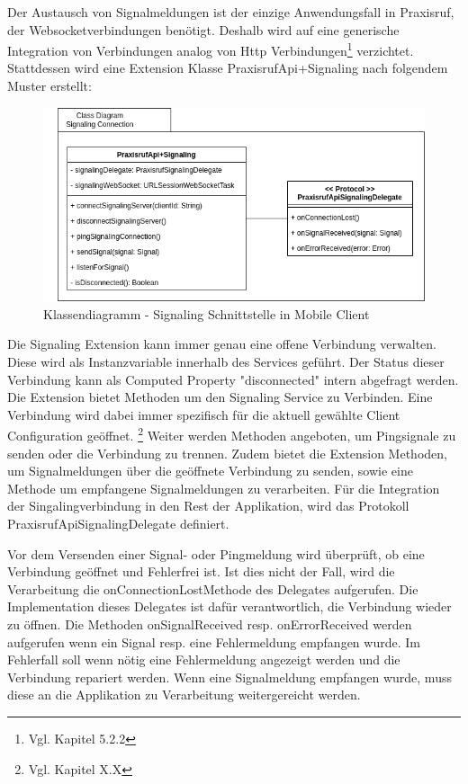 Der Austausch von Signalmeldungen ist der einzige Anwendungsfall in Praxisruf, der Websocketverbindungen benötigt.
Deshalb wird auf eine generische Integration von Verbindungen analog von Http Verbindungen\footnote{Vgl. Kapitel 5.2.2} verzichtet.
Stattdessen wird eine Extension Klasse PraxisrufApi+Signaling nach folgendem Muster erstellt:

\begin{figure}[h]
    \centering
    \begin{minipage}[b]{0.9\textwidth}
        \includegraphics[width=\textwidth]{graphics/diagramms/Class_Mobile_Client_Signaling_Connection}
        \caption{Klassendiagramm - Signaling Schnittstelle in Mobile Client}
    \end{minipage}
\end{figure}

Die Signaling Extension kann immer genau eine offene Verbindung verwalten.
Diese wird als Instanzvariable innerhalb des Services geführt.
Der Status dieser Verbindung kann als Computed Property "disconnected" intern abgefragt werden.
Die Extension bietet Methoden um den Signaling Service zu Verbinden.
Eine Verbindung wird dabei immer spezifisch für die aktuell gewählte Client Configuration geöffnet. \footnote{Vgl. Kapitel X.X}
Weiter werden Methoden angeboten, um Pingsignale zu senden oder die Verbindung zu trennen.
Zudem bietet die Extension Methoden, um Signalmeldungen über die geöffnete Verbindung zu senden,
sowie eine Methode um empfangene Signalmeldungen zu verarbeiten.
Für die Integration der Singalingverbindung in den Rest der Applikation, wird das Protokoll PraxisrufApiSignalingDelegate definiert.

Vor dem Versenden einer Signal- oder Pingmeldung wird überprüft, ob eine Verbindung geöffnet und Fehlerfrei ist.
Ist dies nicht der Fall, wird die Verarbeitung die onConnectionLostMethode des Delegates aufgerufen.
Die Implementation dieses Delegates ist dafür verantwortlich, die Verbindung wieder zu öffnen.
Die Methoden onSignalReceived resp. onErrorReceived werden aufgerufen wenn ein Signal resp. eine Fehlermeldung empfangen wurde.
Im Fehlerfall soll wenn nötig eine Fehlermeldung angezeigt werden und die Verbindung repariert werden.
Wenn eine Signalmeldung empfangen wurde, muss diese an die Applikation zu Verarbeitung weitergereicht werden.

